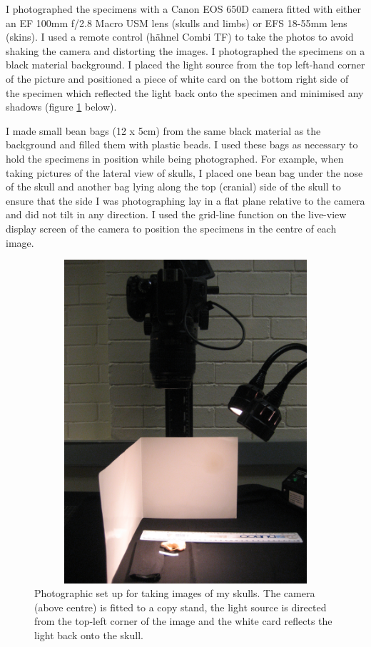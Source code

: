 	I photographed the specimens with a Canon EOS 650D camera fitted with either an EF 100mm f/2.8 Macro USM lens (skulls and limbs) or EFS 18-55mm lens (skins). I used a remote control (h\"ahnel Combi TF) to take the photos to avoid shaking the camera and distorting the images. I photographed the specimens on a black material background. I placed the light source from the top left-hand corner of the picture and positioned a piece of white card on the bottom right side of the specimen which reflected the light back onto the specimen and minimised any shadows (figure \ref{fig:camera} below).

	I made small bean bags (12 x 5cm) from the same black material as the background and filled them with plastic beads. I used these bags as necessary to hold the specimens in position while being photographed. For example, when taking pictures of the lateral view of skulls, I placed one bean bag under the nose of the skull and another bag lying along the top (cranial) side of the skull to ensure that the side I was photographing lay in a flat plane relative to the camera and did not tilt in any direction. 
	I used the grid-line function on the live-view display screen of the camera to position the specimens in the centre of each image. 

\begin{figure}[h] 
  \centering
  \includegraphics[width=12cm, height=12cm, keepaspectratio=true]{Methods/figures/camera.jpg}
    \caption[Photographic set up]%
    {Photographic set up for taking images of my skulls. The camera (above centre) is fitted to a copy stand, the light source is directed from the top-left corner of the image and the white card reflects the light back onto the skull. }%
  \label{fig:camera}
  \end{figure}


